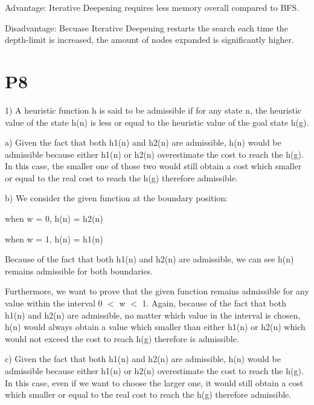 \documentclass{article}
\begin{document}
\hspace{5mm}

Advantage: Iterative Deepening requires less memory overall compared to BFS.

Disadvantage: Becuase Iterative Deepening restarts the search each time the depth-limit is increased, the amount of nodes expanded is significantly higher.

\section*{P8}

\hspace{5mm} 

1) A heuristic function h is said to be admissible if for any state n, the heuristic value of the state h{\small (n)} is less or equal to the heuristic value of the goal state h{\small (g)}.

a) Given the fact that both h{\small 1(n)} and h{\small 2(n)} are admissible, h{\small (n)} would be admissible because either h{\small 1(n)} or h{\small 2(n)} overestimate the cost to reach the h{\small (g)}. In this case, the smaller one of those two would still obtain a cost which smaller or equal to the real cost to reach the h{\small (g)} therefore admissible.

b) We consider the given function at the boundary position:
\begin{center}

when w = 0, h{\small(n)} = h{\small 2(n)}

when w = 1, h{\small(n)} = h{\small 1(n)}

\end{center}

Because of the fact that both h{\small 1(n)} and h{\small 2(n)} are admissible, we can see h{\small(n)} remains admissible for both boundaries.

Furthermore, we want to prove that the given function remains admissible for any value within the interval 0 $<$ w $<$ 1. Again, because of the fact that both h{\small 1(n)} and h{\small 2(n)} are admissible, no matter which value in the interval is chosen,  h{\small (n)} would always obtain a value which smaller than either h{\small 1(n)} or h{\small 2(n)} which would not exceed the cost to reach h{\small (g)} therefore is admissible.

c) Given the fact that both h{\small 1(n)} and h{\small 2(n)} are admissible, h{\small (n)} would be admissible because either h{\small 1(n)} or h{\small 2(n)} overestimate the cost to reach the h{\small (g)}. In this case, even if we want to choose the larger one, it would still obtain a cost which smaller or equal to the real cost to reach the h{\small (g)} therefore admissible.
\end{document}
